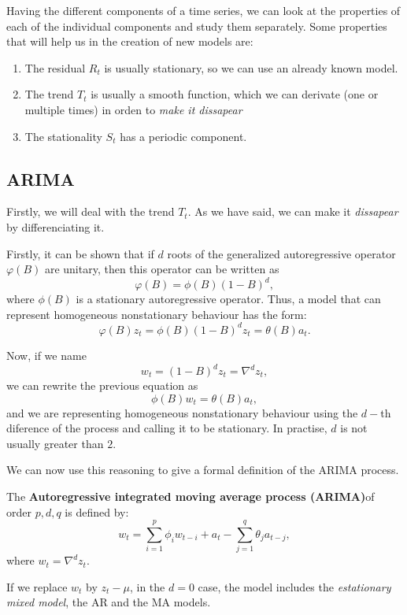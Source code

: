 Having the different components of a time series, we can look at the properties of each of the individual components and study them separately. Some properties that will help us in the creation of new models are:

\begin{enumerate}
\item The residual \(R_t\) is usually stationary, so we can use an already known model.
\item The trend \(T_t\) is usually a smooth function, which we can derivate (one or multiple times) in orden to \emph{make it dissapear}

\item The stationality \(S_t\) has a periodic component.
\end{enumerate}



\subsection{ARIMA}

Firstly, we will deal with the trend \(T_t\). As we have said, we can make it \emph{dissapear} by differenciating it.

Firstly, it can be shown that if \(d\) roots of the generalized autoregressive operator \(\varphi(B)\) are unitary, then this operator can be written as
\[
\varphi(B) = \phi(B)(1-B)^{d},
\]
where \(\phi(B)\) is a stationary autoregressive operator. Thus, a model that can represent homogeneous nonstationary behaviour has the form:
\[
\varphi(B)z_{t} = \phi(B)(1-B)^{d}z_{t} = \theta(B)a_{t}.
\]

Now, if we name
\[
w_{t} = (1-B)^{d}z_{t} = \nabla^{d}z_{t},
\]
we can rewrite the previous equation as
\[
\phi(B)w_{t} = \theta(B)a_{t},
\]
and we are representing homogeneous nonstationary behaviour using the \(d-\)th diference of the process and calling it to be stationary. In practise, \(d\) is not usually greater than \(2\).


We can now use this reasoning to give a formal definition of the ARIMA process.

\begin{ndef}
  The \textbf{Autoregressive integrated moving average process (ARIMA)}of order \(p,d,q\) is defined by:
  \[
    w_{t} = \sum_{i = 1}^{p} \phi_{i}w_{t-i} + a_{t} - \sum_{j = 1}^{q} \theta_{j}a_{t-j},
  \]
  where \(w_{t} = \nabla^{d}z_{t}\).
\end{ndef}

\begin{remark}
If we replace \(w_{t}\) by \(z_{t} - \mu\), in the \(d= 0\) case, the model includes the \emph{estationary mixed model}, the AR and the MA models.
\end{remark}


